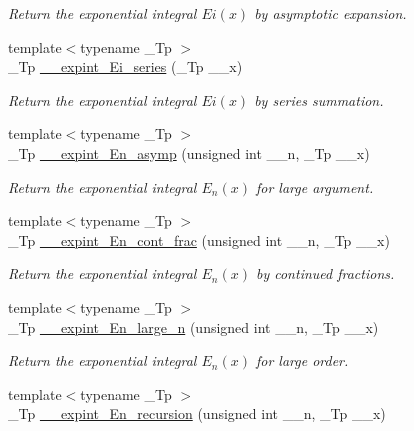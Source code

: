 \begin{DoxyCompactItemize}
\begin{DoxyCompactList}\small\item\em Return the exponential integral $ Ei(x) $ by asymptotic expansion. \end{DoxyCompactList}\item 
{\footnotesize template$<$typename \+\_\+\+Tp $>$ }\\\+\_\+\+Tp \hyperlink{namespacestd_1_1____detail_a7582d1305e84e0263cc6ec2a00a2bf7d}{\+\_\+\+\_\+expint\+\_\+\+Ei\+\_\+series} (\+\_\+\+Tp \+\_\+\+\_\+x)
\begin{DoxyCompactList}\small\item\em Return the exponential integral $ Ei(x) $ by series summation. \end{DoxyCompactList}\item 
{\footnotesize template$<$typename \+\_\+\+Tp $>$ }\\\+\_\+\+Tp \hyperlink{namespacestd_1_1____detail_a3b9f1cc6d66cbd705f52c520eb96b467}{\+\_\+\+\_\+expint\+\_\+\+En\+\_\+asymp} (unsigned int \+\_\+\+\_\+n, \+\_\+\+Tp \+\_\+\+\_\+x)
\begin{DoxyCompactList}\small\item\em Return the exponential integral $ E_n(x) $ for large argument. \end{DoxyCompactList}\item 
{\footnotesize template$<$typename \+\_\+\+Tp $>$ }\\\+\_\+\+Tp \hyperlink{namespacestd_1_1____detail_a34e1eb1248cdad9ceed2aa33732de6ea}{\+\_\+\+\_\+expint\+\_\+\+En\+\_\+cont\+\_\+frac} (unsigned int \+\_\+\+\_\+n, \+\_\+\+Tp \+\_\+\+\_\+x)
\begin{DoxyCompactList}\small\item\em Return the exponential integral $ E_n(x) $ by continued fractions. \end{DoxyCompactList}\item 
{\footnotesize template$<$typename \+\_\+\+Tp $>$ }\\\+\_\+\+Tp \hyperlink{namespacestd_1_1____detail_a77400748c1315de9be10fa5e469df64b}{\+\_\+\+\_\+expint\+\_\+\+En\+\_\+large\+\_\+n} (unsigned int \+\_\+\+\_\+n, \+\_\+\+Tp \+\_\+\+\_\+x)
\begin{DoxyCompactList}\small\item\em Return the exponential integral $ E_n(x) $ for large order. \end{DoxyCompactList}\item 
{\footnotesize template$<$typename \+\_\+\+Tp $>$ }\\\+\_\+\+Tp \hyperlink{namespacestd_1_1____detail_a9b0a2050324390fb6c4a584170289a99}{\+\_\+\+\_\+expint\+\_\+\+En\+\_\+recursion} (unsigned int \+\_\+\+\_\+n, \+\_\+\+Tp \+\_\+\+\_\+x)

\end{DoxyCompactItemize}
